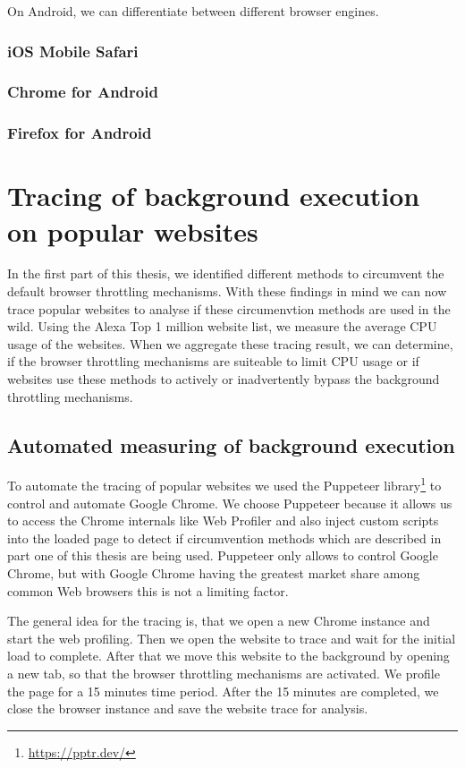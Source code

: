 \documentclass[article,type=bsc,colorback,accentcolor=tud9c]{tudthesis}
\begin{document}
  On Android, we can differentiate between different browser engines.

  \subsubsection{iOS Mobile Safari}

  \subsubsection{Chrome for Android}

  \subsubsection{Firefox for Android}

  \newpage
  \section{Tracing of background execution on popular websites}

  In the first part of this thesis, we identified different methods to circumvent the default browser throttling mechanisms. With these findings in mind we can now trace popular websites to analyse if these circumenvtion methods are used in the wild. Using the Alexa Top 1 million website list, we measure the average CPU usage of the websites. When we aggregate these tracing result, we can determine, if the browser throttling mechanisms are suiteable to limit CPU usage or if websites use these methods to actively or inadvertently bypass the background throttling mechanisms.
  
  \subsection{Automated measuring of background execution}

  To automate the tracing of popular websites we used the Puppeteer library\footnote{\url{https://pptr.dev/}} to control and automate Google Chrome. We choose Puppeteer because it allows us to access the Chrome internals like Web Profiler and also inject custom scripts into the loaded page to detect if circumvention methods which are described in part one of this thesis are being used. Puppeteer only allows to control Google Chrome, but with Google Chrome having the greatest market share among common Web browsers this is not a limiting factor.

  The general idea for the tracing is, that we open a new Chrome instance and start the web profiling. Then we open the website to trace and wait for the initial load to complete. After that we move this website to the background by opening a new tab, so that the browser throttling mechanisms are activated. We profile the page for a 15 minutes time period. After the 15 minutes are completed, we close the browser instance and save the website trace for analysis.
\end{document}
